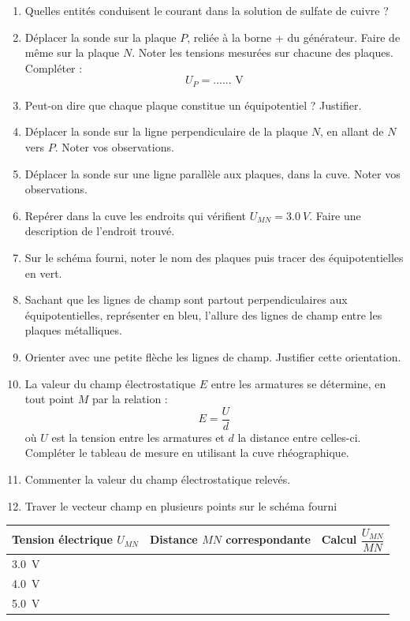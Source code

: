 \documentclass[a4paper,12pt,fleqn]{article}%
\begin{document}
\begin{enumerate}
    \item Quelles entités conduisent le courant dans la solution de sulfate de cuivre ?
    \item Déplacer la sonde sur la plaque $P$, reliée à la borne + du générateur. Faire de même sur la plaque $N$. Noter les tensions mesurées sur chacune des plaques. Compléter : $$ U_P = \text{...... V}$$
    \item Peut-on dire que chaque plaque constitue un équipotentiel ? Justifier.
    \item Déplacer la sonde sur la ligne perpendiculaire de la plaque $N$, en allant de $N$ vers $P$. Noter vos observations.
    \item Déplacer la sonde sur une ligne parallèle aux plaques, dans la cuve. Noter vos observations.
    \item Repérer dans la cuve les endroits qui vérifient $U_{MN} = \SI{3,0}{V}$. Faire une description de l'endroit trouvé.
    \item Sur le schéma fourni, noter le nom des plaques puis tracer des équipotentielles en vert.
    \item Sachant que les lignes de champ sont partout perpendiculaires aux équipotentielles, représenter en bleu, l'allure des lignes de champ entre les plaques métalliques.
    \item Orienter avec une petite flèche les lignes de champ. Justifier cette orientation.
    \item La valeur du champ électrostatique $E$ entre les armatures se détermine, en tout point $M$ par la relation : $$ E = \dfrac{U}{d}$$ où $U$ est la tension entre les armatures et $d$ la distance entre celles-ci. Compléter le tableau de mesure en utilisant la cuve rhéographique.
    \item Commenter la valeur du champ électrostatique relevés.
    \item Traver le vecteur champ en plusieurs points sur le schéma fourni
\end{enumerate}

\begin{table}
    \centering
    \begin{tabular}{|>{\centering}m{.3\linewidth}|>{\centering}m{.3\linewidth}|>{\centering\arraybackslash}m{.3\linewidth}|}
        \hline
        \textbf{Tension électrique $U_{MN}$} & \textbf{Distance $MN$ correspondante} & \textbf{Calcul $\dfrac{U_{MN}}{MN}$} \\
        \hline
        \SI{3,0}{V} & & \\
        \hline
        \SI{4,0}{V} & & \\
        \hline
        \SI{5,0}{V} & & \\
        \hline
    \end{tabular}
\end{table}

\newpage
\begin{figure}
    \centering
\end{figure}
\end{document}
